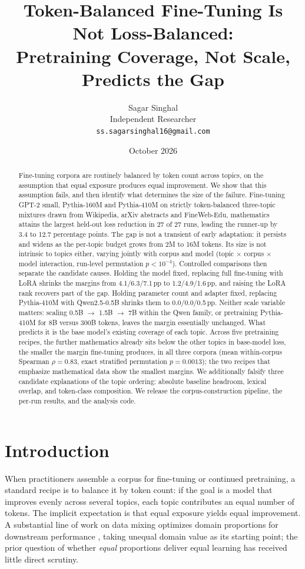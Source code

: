 \documentclass[11pt]{article}
\title{Token-Balanced Fine-Tuning Is Not Loss-Balanced:\\
Pretraining Coverage, Not Scale, Predicts the Gap}
\author{Sagar Singhal\\
Independent Researcher\\
\texttt{ss.sagarsinghal16@gmail.com}}
\date{October 2026}
\begin{document}
\maketitle

\begin{abstract}
Fine-tuning corpora are routinely balanced by token count across topics, on
the assumption that equal exposure produces equal improvement. We show that
this assumption fails, and then identify what determines the size of the
failure. Fine-tuning GPT-2 small, Pythia-160M and Pythia-410M on strictly
token-balanced three-topic mixtures drawn from Wikipedia, arXiv abstracts
and FineWeb-Edu, mathematics attains the largest held-out loss reduction in
27 of 27 runs, leading the runner-up by 3.4 to 12.7 percentage points. The
gap is not a transient of early adaptation: it persists and widens as the
per-topic budget grows from 2M to 16M tokens. Its size is not intrinsic to
topics either, varying jointly with corpus and model (topic $\times$ corpus
$\times$ model interaction, run-level permutation $p<10^{-4}$). Controlled comparisons then separate the candidate causes. Holding the model
fixed, replacing full fine-tuning with LoRA shrinks the margins from
4.1/6.3/7.1\,pp to 1.2/4.9/1.6\,pp, and raising the LoRA rank recovers part
of the gap. Holding parameter count and adapter fixed, replacing Pythia-410M
with Qwen2.5-0.5B shrinks them to 0.0/0.0/0.5\,pp. Neither scale variable
matters: scaling 0.5B $\to$ 1.5B $\to$ 7B within the Qwen family, or
pretraining Pythia-410M for 8B versus 300B tokens, leaves the margin
essentially unchanged. What predicts it is the base model's existing
coverage of each topic. Across five pretraining recipes, the further
mathematics already sits below the other topics in base-model loss, the
smaller the margin fine-tuning produces, in all three corpora (mean
within-corpus Spearman $\rho{=}0.83$, exact stratified permutation
$p{=}0.0013$); the two recipes that emphasize mathematical data show the
smallest margins. We additionally falsify three candidate explanations of
the topic ordering: absolute baseline headroom, lexical overlap, and
token-class composition. We release the corpus-construction pipeline, the per-run results, and the analysis code.
\end{abstract}

\section{Introduction}

When practitioners assemble a corpus for fine-tuning or continued
pretraining, a standard recipe is to balance it by token count: if the goal
is a model that improves evenly across several topics, each topic
contributes an equal number of tokens. The implicit expectation is that
equal exposure yields equal improvement. A substantial line of work on data
mixing optimizes domain proportions for downstream performance
\citep{doremi,doge,regmix}, taking unequal domain value as its starting
point; the prior question of whether \emph{equal} proportions deliver equal
learning has received little direct scrutiny.
\end{document}
